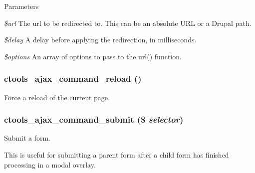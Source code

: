 \begin{DoxyParams}{Parameters}
\item[{\em \$url}]The url to be redirected to. This can be an absolute URL or a Drupal path. \item[{\em \$delay}]A delay before applying the redirection, in milliseconds. \item[{\em \$options}]An array of options to pass to the url() function. \end{DoxyParams}
\hypertarget{ctools_2includes_2ajax_8inc_abadcd3021f5a0dedff23944d40dbc1ae}{
\subsubsection[{ctools\_\-ajax\_\-command\_\-reload}]{\setlength{\rightskip}{0pt plus 5cm}ctools\_\-ajax\_\-command\_\-reload ()}}
\label{ctools_2includes_2ajax_8inc_abadcd3021f5a0dedff23944d40dbc1ae}
Force a reload of the current page. \hypertarget{ctools_2includes_2ajax_8inc_a911fe17d610b49cdf90a6d3009bab2b6}{
\subsubsection[{ctools\_\-ajax\_\-command\_\-submit}]{\setlength{\rightskip}{0pt plus 5cm}ctools\_\-ajax\_\-command\_\-submit (\$ {\em selector})}}
\label{ctools_2includes_2ajax_8inc_a911fe17d610b49cdf90a6d3009bab2b6}
Submit a form.

This is useful for submitting a parent form after a child form has finished processing in a modal overlay.


